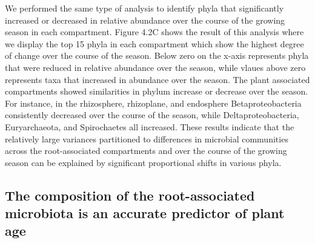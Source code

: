 We performed the same type of analysis to identify phyla that significantly increased or decreased in relative abundance over the course of the growing season in each compartment. Figure 4.2C shows the result of this analysis where we display the top 15 phyla in each compartment which show the highest degree of change over the course of the season. Below zero on the x-axis represents phyla that were reduced in relative abundance over the season, while vlaues above zero represents taxa that increased in abundance over the season. The plant associated compartments showed similarities in phylum increase or decrease over the season. For instance, in the rhizosphere, rhizoplane, and endosphere Betaproteobacteria consistently decreased over the course of the season, while Deltaproteobacteria, Euryarchaeota, and Spirochaetes all increased. These results indicate that the relatively large variances partitioned to differences in microbial communities across the root-associated compartments and over the course of the growing season can be explained by significant proportional shifts in various phyla.

\subsection{The composition of the root-associated microbiota is an accurate predictor of plant age}

